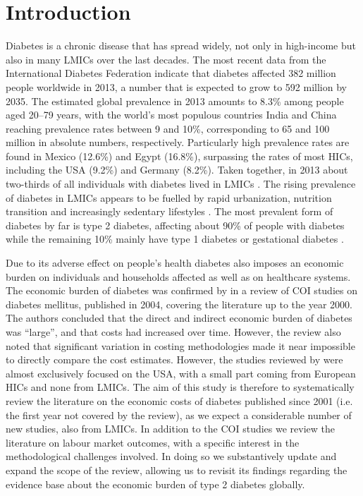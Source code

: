 \section{Introduction}
Diabetes is a chronic disease that has spread widely, not only in high-income but also in many \acp{LMIC} over the last decades. The most recent data from the International Diabetes Federation indicate that diabetes affected 382 million people worldwide in 2013, a number that is expected to grow to 592 million by 2035. The estimated global prevalence in 2013 amounts to 8.3\% among people aged 20--79 years, with the world's most populous countries India and China reaching prevalence rates between 9 and 10\%, corresponding to 65 and 100 million in absolute numbers, respectively. Particularly high prevalence rates are found in Mexico (12.6\%) and Egypt (16.8\%), surpassing the rates of most \acp{HIC}, including the USA (9.2\%) and Germany (8.2\%).\parencite{InternationalDiabetesFederation2013} Taken together, in 2013 about two-thirds of all individuals with diabetes lived in \acp{LMIC} \parencite{InternationalDiabetesFederation2013}. The rising prevalence of diabetes in \acp{LMIC} appears to be fuelled by rapid urbanization, nutrition transition and increasingly sedentary lifestyles \parencite{Hu2011}. The most prevalent form of diabetes by far is type 2 diabetes, affecting about 90\% of people with diabetes while the remaining 10\% mainly have type 1 diabetes or gestational diabetes \parencite{InternationalDiabetesFederation2013}.

Due to its adverse effect on people's health diabetes also imposes an economic burden on individuals and households affected as well as on healthcare systems. The economic burden of diabetes was confirmed by   in a review of \ac{COI} studies on diabetes mellitus, published in 2004, covering the literature up to the year 2000. The authors concluded that the direct and indirect economic burden of diabetes was ``large'', and that costs had increased over time. However, the review also noted that significant variation in costing methodologies made it near impossible to directly compare the cost estimates. However, the studies reviewed by \textcite{Ettaro2004} were almost exclusively focused on the USA, with a small part coming from European \acp{HIC} and none from \acp{LMIC}. The aim of this study is therefore to systematically review the literature on the economic costs of diabetes published since 2001 (i.e. the first year not covered by the \textcite{Ettaro2004} review), as we expect a considerable number of new studies, also from \acp{LMIC}. In addition to the \ac{COI} studies we review the literature on labour market outcomes, with a specific interest in the methodological challenges involved. In doing so we substantively update and expand the scope of the \textcite{Ettaro2004} review, allowing us to revisit its findings regarding the evidence base about the economic burden of type 2 diabetes globally.

